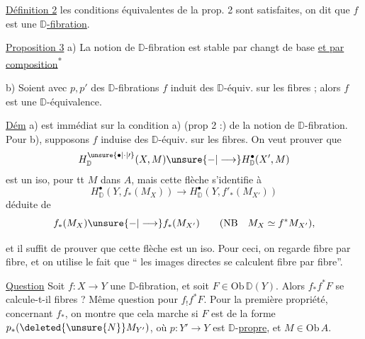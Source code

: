 \uline{Définition 2}   les conditions équivalentes de la prop. 2 sont satisfaites, on dit que $f$ est une \uline{$\mathbb D$-fibration}.


\uline{Proposition 3} a) La notion de $\mathbb D$-fibration est stable par changt de base \uline{et par composition}\textsuperscript{*}


b) Soient
avec $p,p'$ des $\mathbb D$-fibrations   $f$ induit des $\mathbb D$-équiv. sur les fibres ; alors $f$ est une $\mathbb D$-équivalence.


\uline{Dém} a) est immédiat sur la condition a) (prop 2 :) de la notion de $\mathbb D$-fibration. Pour b), supposons  $f$ induise des $\mathbb D$-équiv. sur les fibres. On veut prouver que
\[
H^{\unsure{\bullet|\cdot|\prime}}_{\mathbb D}(X,M)\unsure{-|\longrightarrow} H^\bullet_{\mathbb D}(X',M)
\]
est un iso, pour tt $M$ dans $A$, mais cette flèche s'identifie à
\[
H^\bullet_{\mathbb D}(Y,f_*(M_X))\longrightarrow H^\bullet_{\mathbb D}(Y,f'_*(M_{X'}))
\]
déduite de
\[
f_*(M_X)\unsure{-|\longrightarrow} f_*(M_{X'})\qquad(\mathrm{NB}\quad M_X\simeq f^*M_{X'}),
\]

et il suffit de prouver que cette flèche est un iso. Pour ceci, on regarde fibre par fibre, et on utilise le fait que `` les images directes se calculent fibre par fibre''.

\uline{Question} Soit $f:X\longrightarrow Y$ une $\mathbb D$-fibration, et soit $F\in\mathrm{Ob}\,\mathbb D(Y)$. Alors $f_* f^*F$ se calcule-t-il     fibres ? Même question pour $f_! f^*F$. Pour la première propriété, concernant $f_*$, on montre que cela marche si $F$ est de la forme $p_*(\deleted{\unsure{N}}M_{Y'})$, où $p:Y'\longrightarrow Y$ est $\mathbb D$-\uline{propre}, et $M\in\mathrm{Ob}\,A$.

